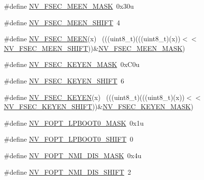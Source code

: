 \begin{DoxyCompactItemize}
\item 
\#define \hyperlink{group___n_v___register___masks_ga02f5aa86e1f5bceefd0378fa736d5656}{N\+V\+\_\+\+F\+S\+E\+C\+\_\+\+M\+E\+E\+N\+\_\+\+M\+A\+SK}~0x30u
\item 
\#define \hyperlink{group___n_v___register___masks_ga13adfbdf46af9e59b446d17ce90b49c1}{N\+V\+\_\+\+F\+S\+E\+C\+\_\+\+M\+E\+E\+N\+\_\+\+S\+H\+I\+FT}~4
\item 
\#define \hyperlink{group___n_v___register___masks_gafb2cb85643ad7aa0997ed49baa90379f}{N\+V\+\_\+\+F\+S\+E\+C\+\_\+\+M\+E\+EN}(x)                                                ~(((uint8\+\_\+t)(((uint8\+\_\+t)(x))$<$$<$\hyperlink{group___n_v___register___masks_ga13adfbdf46af9e59b446d17ce90b49c1}{N\+V\+\_\+\+F\+S\+E\+C\+\_\+\+M\+E\+E\+N\+\_\+\+S\+H\+I\+FT}))\&\hyperlink{group___n_v___register___masks_ga02f5aa86e1f5bceefd0378fa736d5656}{N\+V\+\_\+\+F\+S\+E\+C\+\_\+\+M\+E\+E\+N\+\_\+\+M\+A\+SK})
\item 
\#define \hyperlink{group___n_v___register___masks_ga50a87e963eeaaf5fdb904e7bac9099af}{N\+V\+\_\+\+F\+S\+E\+C\+\_\+\+K\+E\+Y\+E\+N\+\_\+\+M\+A\+SK}~0x\+C0u
\item 
\#define \hyperlink{group___n_v___register___masks_ga3df55e24a4dc42a19afc15b4a3137bae}{N\+V\+\_\+\+F\+S\+E\+C\+\_\+\+K\+E\+Y\+E\+N\+\_\+\+S\+H\+I\+FT}~6
\item 
\#define \hyperlink{group___n_v___register___masks_ga36512e2f79f5136a62b0f32ad2955c25}{N\+V\+\_\+\+F\+S\+E\+C\+\_\+\+K\+E\+Y\+EN}(x)                                              ~(((uint8\+\_\+t)(((uint8\+\_\+t)(x))$<$$<$\hyperlink{group___n_v___register___masks_ga3df55e24a4dc42a19afc15b4a3137bae}{N\+V\+\_\+\+F\+S\+E\+C\+\_\+\+K\+E\+Y\+E\+N\+\_\+\+S\+H\+I\+FT}))\&\hyperlink{group___n_v___register___masks_ga50a87e963eeaaf5fdb904e7bac9099af}{N\+V\+\_\+\+F\+S\+E\+C\+\_\+\+K\+E\+Y\+E\+N\+\_\+\+M\+A\+SK})
\item 
\#define \hyperlink{group___n_v___register___masks_ga47bf10ef60ce96fc8d7fdbd7378d9a52}{N\+V\+\_\+\+F\+O\+P\+T\+\_\+\+L\+P\+B\+O\+O\+T0\+\_\+\+M\+A\+SK}~0x1u
\item 
\#define \hyperlink{group___n_v___register___masks_ga342e15fe4074c4a1bef9dcd73b312b56}{N\+V\+\_\+\+F\+O\+P\+T\+\_\+\+L\+P\+B\+O\+O\+T0\+\_\+\+S\+H\+I\+FT}~0
\item 
\#define \hyperlink{group___n_v___register___masks_gaa2bcf41c89cbfe86ef8eaf6fff2ad068}{N\+V\+\_\+\+F\+O\+P\+T\+\_\+\+N\+M\+I\+\_\+\+D\+I\+S\+\_\+\+M\+A\+SK}~0x4u
\item 
\#define \hyperlink{group___n_v___register___masks_ga8a4632e08257c81a80d8be3cdac911f9}{N\+V\+\_\+\+F\+O\+P\+T\+\_\+\+N\+M\+I\+\_\+\+D\+I\+S\+\_\+\+S\+H\+I\+FT}~2

\end{DoxyCompactItemize}
